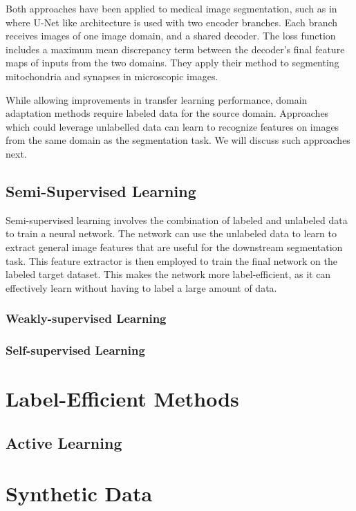 Both approaches have been applied to medical image segmentation, such as in \citet{bermudez-chaconDomainadaptiveTwostreamUNet2018} where U-Net like architecture is used with two encoder branches. Each branch receives images of one image domain, and a shared decoder. The loss function includes a maximum mean discrepancy term between the decoder's final feature maps of inputs from the two domains. They apply their method to segmenting mitochondria and synapses in microscopic images. 

While allowing improvements in transfer learning performance, domain adaptation methods require labeled data for the source domain. Approaches which could leverage unlabelled data can learn to recognize features on images from the same domain as the segmentation task. We will discuss such approaches next.

	\subsection{Semi-Supervised Learning}
	
Semi-supervised learning involves the combination of labeled and unlabeled data to train a neural network. The network can use the unlabeled data to learn to extract general image features that are useful for the downstream segmentation task. This feature extractor is then employed to train the final network on the labeled target dataset. This makes the network more label-efficient, as it can effectively learn without having to label a large amount of data.
	
		\subsubsection{Weakly-supervised Learning}
		\subsubsection{Self-supervised Learning}
			
\section{Label-Efficient Methods}

	\subsection{Active Learning} %

\section{Synthetic Data}

